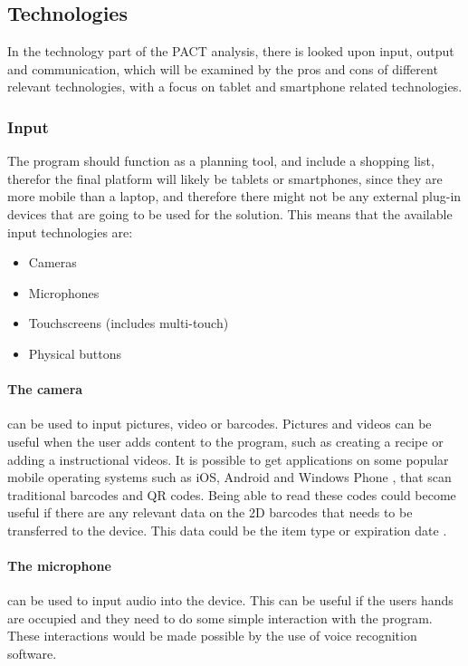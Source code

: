 \subsection{Technologies} \label{PACTech}
In the technology part of the PACT analysis, there is looked upon input, output and communication, which will be examined by the pros and cons of different relevant technologies, with a focus on tablet and smartphone related technologies.

\subsubsection{Input}
The program should function as a planning tool, and include a shopping list, therefor the final platform will likely be tablets or smartphones, since they are more mobile than a laptop, and therefore there might not be any external plug-in devices that are going to be used for the solution. This means that the available input technologies are:
\begin{itemize}
    \item Cameras
    \item Microphones
    \item Touchscreens (includes multi-touch)
    \item Physical buttons
\end{itemize}

\paragraph{The camera} can be used to input pictures, video or barcodes. Pictures and videos can be useful when the user adds content to the program, such as creating a recipe or adding a instructional videos. It is possible to get applications on some popular mobile operating systems such as iOS, Android and Windows Phone \cite{barcode_Phones}, that scan traditional barcodes and QR codes. Being able to read these codes could become useful if there are any relevant data on the 2D barcodes that needs to be transferred to the device. This data could be the item type or expiration date \cite{barcodeInc_FAQ}.           
    
\paragraph{The microphone} can be used to input audio into the device. This can be useful if the users hands are occupied and they need to do some simple interaction with the program. These interactions would be made possible by the use of voice recognition software.

